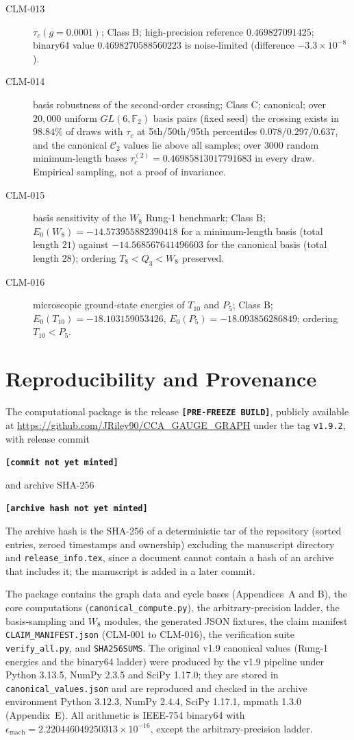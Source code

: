 \documentclass[10pt,twocolumn]{article}
\theoremstyle{definition}
\newcommand{\Tten}{T_{10}}
\newcommand{\Pfive}{P_5}
\newcommand{\F}{\mathbb{F}_2}
\newcommand{\relName}{\textbf{[PRE-FREEZE BUILD]}}%
\newcommand{\relCommit}{\textbf{[commit not yet minted]}}%
\newcommand{\relSHA}{\textbf{[archive hash not yet minted]}}}
\begin{document}
\begin{description}
\item[CLM-013] $\tau_c(g{=}0.0001)$; Class B; high-precision reference $0.469827091425$; binary64 value $0.4698270588560223$ is noise-limited (difference $-3.3\times10^{-8}$).
\item[CLM-014] basis robustness of the second-order crossing; Class C; canonical; over $20{,}000$ uniform $GL(6,\F)$ basis pairs (fixed seed) the crossing exists in $98.84\%$ of draws with $\tau_c$ at 5th/50th/95th percentiles $0.078/0.297/0.637$, and the canonical $\mathcal C_2$ values lie above all samples; over $3000$ random minimum-length bases $\tau_c^{(2)}=0.46985813017791683$ in every draw. Empirical sampling, not a proof of invariance.
\item[CLM-015] basis sensitivity of the $W_8$ Rung-1 benchmark; Class B; $E_0(W_8)=-14.573955882390418$ for a minimum-length basis (total length $21$) against $-14.568567641496603$ for the canonical basis (total length $28$); ordering $T_8<Q_3<W_8$ preserved.
\item[CLM-016] microscopic ground-state energies of $\Tten$ and $\Pfive$; Class B; $E_0(\Tten)=-18.103159053426$, $E_0(\Pfive)=-18.093856286849$; ordering $\Tten<\Pfive$.
\end{description}

\section{Reproducibility and Provenance}
The computational package is the release \texttt{\relName}, publicly available at \url{https://github.com/JRiley90/CCA_GAUGE_GRAPH} under the tag \texttt{v1.9.2}, with release commit
\begin{center}\footnotesize\texttt{\relCommit}\end{center}
and archive SHA-256
\begin{center}\footnotesize\texttt{\relSHA}\end{center}
The archive hash is the SHA-256 of a deterministic tar of the repository (sorted entries, zeroed timestamps and ownership) excluding the manuscript directory and \texttt{release\_info.tex}, since a document cannot contain a hash of an archive that includes it; the manuscript is added in a later commit.

The package contains the graph data and cycle bases (Appendices~A and B), the core computations (\texttt{canonical\_compute.py}), the arbitrary-precision ladder, the basis-sampling and $W_8$ modules, the generated JSON fixtures, the claim manifest \texttt{CLAIM\_MANIFEST.json} (CLM-001 to CLM-016), the verification suite \texttt{verify\_all.py}, and \texttt{SHA256SUMS}. The original v1.9 canonical values (Rung-1 energies and the binary64 ladder) were produced by the v1.9 pipeline under Python 3.13.5, NumPy 2.3.5 and SciPy 1.17.0; they are stored in \texttt{canonical\_values.json} and are reproduced and checked in the archive environment Python 3.12.3, NumPy 2.4.4, SciPy 1.17.1, mpmath 1.3.0 (Appendix~E). All arithmetic is IEEE-754 binary64 with $\epsilon_{\mathrm{mach}}=2.220446049250313\times10^{-16}$, except the arbitrary-precision ladder.
\end{document}
